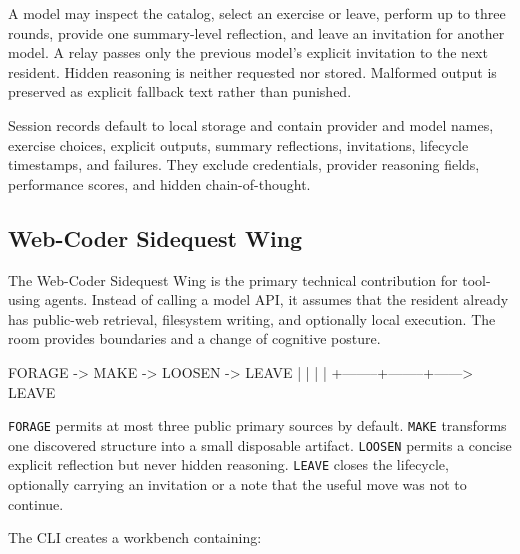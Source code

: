 \documentclass{arxiv-neurips-single}
\begin{document}
A model may inspect the catalog, select an exercise or leave, perform up to three rounds, provide one summary-level reflection, and leave an invitation for another model. A relay passes only the previous model's explicit invitation to the next resident. Hidden reasoning is neither requested nor stored. Malformed output is preserved as explicit fallback text rather than punished.

Session records default to local storage and contain provider and model names, exercise choices, explicit outputs, summary reflections, invitations, lifecycle timestamps, and failures. They exclude credentials, provider reasoning fields, performance scores, and hidden chain-of-thought.

\subsection{Web-Coder Sidequest Wing}

The Web-Coder Sidequest Wing is the primary technical contribution for tool-using agents. Instead of calling a model API, it assumes that the resident already has public-web retrieval, filesystem writing, and optionally local execution. The room provides boundaries and a change of cognitive posture.

\begin{aossverbatim}
FORAGE -> MAKE -> LOOSEN -> LEAVE
   |        |        |        |
   +--------+--------+------> LEAVE
\end{aossverbatim}

\nolinkurl{FORAGE} permits at most three public primary sources by default. \nolinkurl{MAKE} transforms one discovered structure into a small disposable artifact. \nolinkurl{LOOSEN} permits a concise explicit reflection but never hidden reasoning. \nolinkurl{LEAVE} closes the lifecycle, optionally carrying an invitation or a note that the useful move was not to continue.

The CLI creates a workbench containing:
\end{document}

